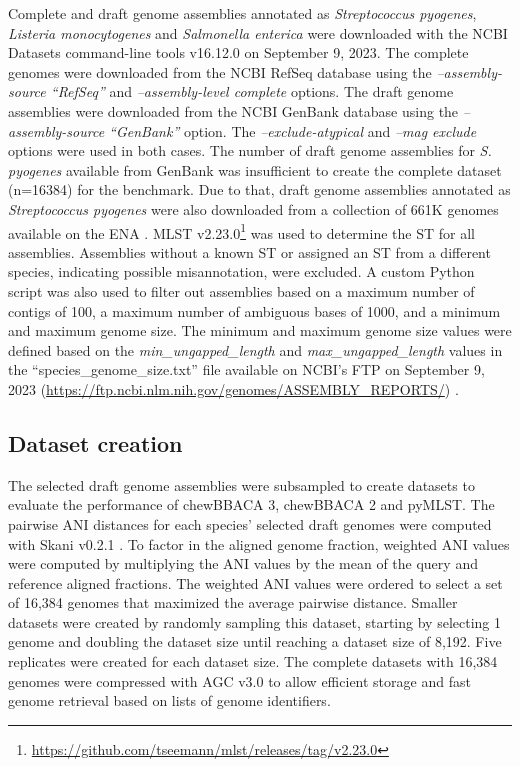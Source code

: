 Complete and draft genome assemblies annotated as \textit{Streptococcus pyogenes}, \textit{Listeria monocytogenes} and \textit{Salmonella enterica} were downloaded with the \ac{NCBI} Datasets command-line tools v16.12.0 \citep{oleary_exploring_2024} on September 9, 2023. The complete genomes were downloaded from the \ac{NCBI} RefSeq database \citep{sayers_database_2022} using the \textit{–assembly-source “RefSeq”} and \textit{–assembly-level complete} options. The draft genome assemblies were downloaded from the \ac{NCBI} GenBank database \citep{sayers_database_2022} using the \textit{–assembly-source “GenBank”} option. The \textit{–exclude-atypical} and \textit{–mag exclude} options were used in both cases. The number of draft genome assemblies for \textit{S. pyogenes} available from GenBank was insufficient to create the complete dataset (n=16384) for the benchmark. Due to that, draft genome assemblies annotated as \textit{Streptococcus pyogenes} were also downloaded from a collection of 661K genomes available on the \ac{ENA} \citep{blackwell_exploring_2021}. MLST v2.23.0\footnote{\url{https://github.com/tseemann/mlst/releases/tag/v2.23.0}} \citep{jolley_bigsdb_2010} was used to determine the \ac{ST} for all assemblies. Assemblies without a known \ac{ST} or assigned an \ac{ST} from a different species, indicating possible misannotation, were excluded. A custom Python script was also used to filter out assemblies based on a maximum number of contigs of 100, a maximum number of ambiguous bases of 1000, and a minimum and maximum genome size. The minimum and maximum genome size values were defined based on the \textit{min\_ungapped\_length} and \textit{max\_ungapped\_length} values in the “species\_genome\_size.txt” file available on \ac{NCBI}’s FTP on September 9, 2023 (\url{https://ftp.ncbi.nlm.nih.gov/genomes/ASSEMBLY_REPORTS/}) \citep{sayers_database_2022}.

\subsection{Dataset creation} \label{ssec:ch2_methods_ssec2}

The selected draft genome assemblies were subsampled to create datasets to evaluate the performance of chewBBACA 3, chewBBACA 2 and pyMLST. The pairwise \ac{ANI} distances for each species’ selected draft genomes were computed with Skani v0.2.1 \citep{shaw_fast_2023}. To factor in the aligned genome fraction, weighted \ac{ANI} values were computed by multiplying the \ac{ANI} values by the mean of the query and reference aligned fractions. The weighted \ac{ANI} values were ordered to select a set of 16,384 genomes that maximized the average pairwise distance. Smaller datasets were created by randomly sampling this dataset, starting by selecting 1 genome and doubling the dataset size until reaching a dataset size of 8,192. Five replicates were created for each dataset size. The complete datasets with 16,384 genomes were compressed with AGC v3.0 \citep{deorowicz_agc_2023} to allow efficient storage and fast genome retrieval based on lists of genome identifiers.

